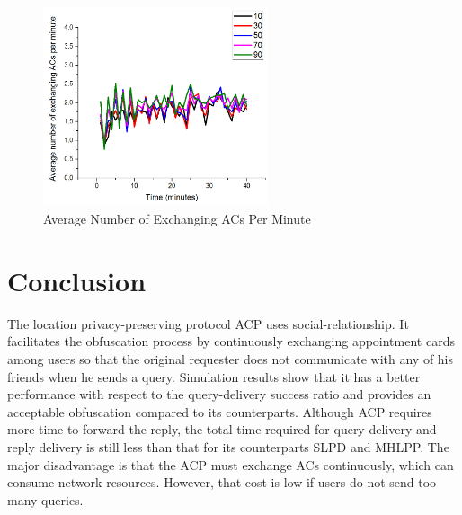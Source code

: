 \documentclass[conference]{IEEEtran}
\begin{document}
\begin{figure} [hbtp]
  \centering 
  \includegraphics[width=2.6in]{figures/F422AverageNumberofExchangingACsPerMinute.png}
  \caption{Average Number of Exchanging ACs Per Minute} 
  \label{fig:F422AverageNumberofExchangingACsPerMinute} %
\end{figure}

\section*{Conclusion}

The location privacy-preserving protocol ACP uses social-relationship. It facilitates the obfuscation process by continuously exchanging appointment cards among users so that the original requester does not communicate with any of his friends when he sends a query. Simulation results show that it has a better performance with respect to the query-delivery success ratio and provides an acceptable obfuscation compared to its counterparts. Although ACP requires more time to forward the reply, the total time required for query delivery and reply delivery is still less than that for its counterparts SLPD and MHLPP. The major disadvantage is that the ACP must exchange ACs continuously, which can consume network resources. However, that cost is low if users do not send too many queries.

\end{document}
